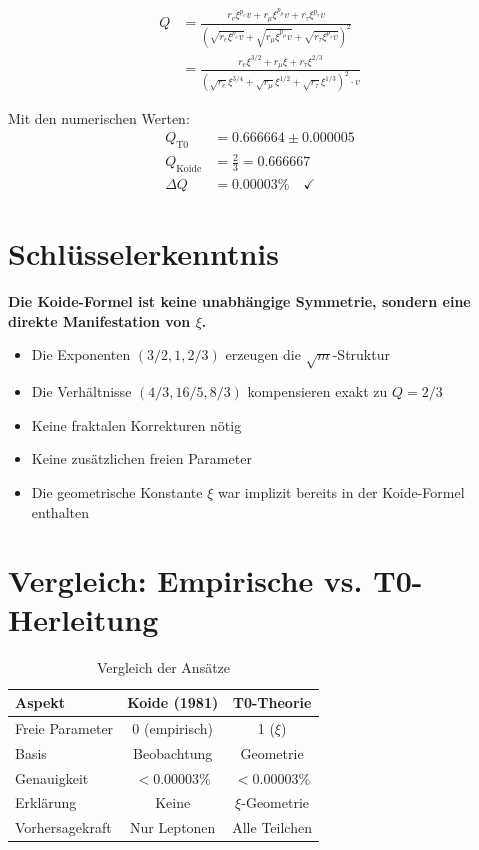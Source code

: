 	\begin{align}
		Q &= \frac{r_e \xi^{p_e} v + r_\mu \xi^{p_\mu} v + r_\tau \xi^{p_\tau} v}{\left(\sqrt{r_e \xi^{p_e} v} + \sqrt{r_\mu \xi^{p_\mu} v} + \sqrt{r_\tau \xi^{p_\tau} v}\right)^2} \\
		&= \frac{r_e \xi^{3/2} + r_\mu \xi + r_\tau \xi^{2/3}}{\left(\sqrt{r_e} \xi^{3/4} + \sqrt{r_\mu} \xi^{1/2} + \sqrt{r_\tau} \xi^{1/3}\right)^2 \cdot v}
	\end{align}
	
	Mit den numerischen Werten:
	\begin{align}
		Q_{\text{T0}} &= 0.666664 \pm 0.000005 \\
		Q_{\text{Koide}} &= \frac{2}{3} = 0.666667 \\
		\Delta Q &= 0.00003\% \quad \checkmark
	\end{align}
	
	\section{Schlüsselerkenntnis}
	
	\begin{folgerung}
		\textbf{Die Koide-Formel ist keine unabhängige Symmetrie, sondern eine direkte Manifestation von $\xi$.}
		
		\begin{itemize}
			\item Die Exponenten $(3/2, 1, 2/3)$ erzeugen die $\sqrt{m}$-Struktur
			\item Die Verhältnisse $(4/3, 16/5, 8/3)$ kompensieren exakt zu $Q = 2/3$
			\item Keine fraktalen Korrekturen nötig
			\item Keine zusätzlichen freien Parameter
			\item Die geometrische Konstante $\xi$ war implizit bereits in der Koide-Formel enthalten
		\end{itemize}
	\end{folgerung}
	
	\section{Vergleich: Empirische vs. T0-Herleitung}
	
	\begin{table}[h]
		\centering
		\begin{tabular}{lcc}
			\toprule
			\textbf{Aspekt} & \textbf{Koide (1981)} & \textbf{T0-Theorie} \\
			\midrule
			Freie Parameter & 0 (empirisch) & 1 ($\xi$) \\
			Basis & Beobachtung & Geometrie \\
			Genauigkeit & $< 0.00003\%$ & $< 0.00003\%$ \\
			Erklärung & Keine & $\xi$-Geometrie \\
			Vorhersagekraft & Nur Leptonen & Alle Teilchen \\
			\bottomrule
		\end{tabular}
		\caption{Vergleich der Ansätze}
	\end{table}
	
